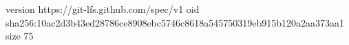 version https://git-lfs.github.com/spec/v1
oid sha256:10ac2d3b43ed28786ce8908ebc5746c8618a545750319eb915b120a2aa373aa1
size 75
